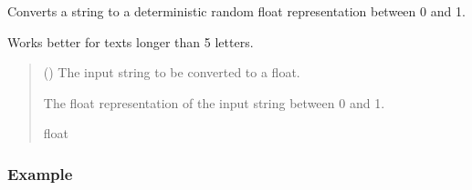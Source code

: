 \documentclass[letterpaper,10pt,english]{sphinxmanual}
\begin{document}
\begin{fulllineitems}
\label{\detokenize{generated/eflatun_uav.helpers.number_generators:eflatun_uav.helpers.number_generators.convert_string_to_float}}
\pysigstartsignatures
{}
\pysigstopsignatures
\sphinxAtStartPar
Converts a string to a deterministic random float representation between 0 and 1.

\sphinxAtStartPar
Works better for texts longer than 5 letters.
\begin{quote}\begin{description}
\sphinxAtStartPar
{} () \textendash{} The input string to be converted to a float.

\sphinxAtStartPar
The float representation of the input string between 0 and 1.

\sphinxAtStartPar
float

\end{description}\end{quote}
\subsubsection*{Example}

\begin{sphinxVerbatim}[commandchars=\\\{\}]
\end{sphinxVerbatim}

\end{fulllineitems}
\end{document}
